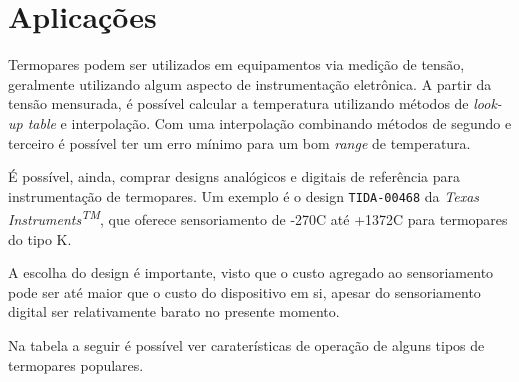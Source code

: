 \documentclass[a4paper,12pt]{report}
\begin{document}
	\pagebreak
	
	\section{Aplicações}
	
	Termopares podem ser utilizados em equipamentos via medição de tensão, geralmente utilizando algum aspecto de instrumentação eletrônica. A partir da tensão mensurada, é possível calcular a temperatura utilizando métodos de \textit{look-up table} e interpolação. Com uma interpolação combinando métodos de segundo e terceiro é possível ter um erro mínimo para um bom \textit{range} de temperatura. 
	
	É possível, ainda, comprar designs analógicos e digitais de referência para instrumentação de termopares. Um exemplo é o design \texttt{TIDA-00468} da \textit{Texas Instruments\textsuperscript{TM}}, que oferece sensoriamento de -270\degree C até +1372\degree C para termopares do tipo K.
	
	A escolha do design é importante, visto que o custo agregado ao sensoriamento pode ser até maior que o custo do dispositivo em si, apesar do sensoriamento digital ser relativamente barato no presente momento.
	
	Na tabela a seguir é possível ver caraterísticas de operação de alguns tipos de termopares populares.
	
\end{document}
